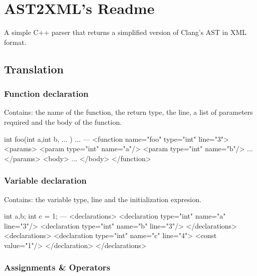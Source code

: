 %
%

\chapter{AST2XML's Readme}

\pagestyle{plain}

A simple C++ parser that returns a simplified version of Clang's AST in XML format.

\section{Translation}

\subsection*{Function declaration}

Contains: the name of the function, the return type, the line, a list of parameters required and the body of the function.

        int foo(int a,int b, ... ){
            ...
        }
 ---
        <function name="foo" type="int" line="3">
            <params>
                <param type="int" name="a"/>
                <param type="int" name="b"/>
                ...
            </params>
            <body>
                ...
            </body>
        </function>

\subsection*{Variable declaration}

Contains: the variable type, line and the initialization expresion.

        int a,b;
        int c = 1;
---
        <declarations>
            <declaration type="int" name="a" line="3"/>
            <declaration type="int" name="b" line="3"/>
        </declarations>
        <declarations>
            <declaration type="int" name="c" line="4">
                <const value="1"/>
            </declaration>
        </declarations>

\subsection*{Assignments & Operators}

